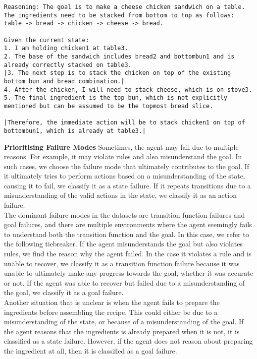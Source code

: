 \begin{lstlisting}
Reasoning: The goal is to make a cheese chicken sandwich on a table. The ingredients need to be stacked from bottom to top as follows: table -> bread -> chicken -> cheese -> bread.

Given the current state:
1. I am holding chicken1 at table3.
2. The base of the sandwich includes bread2 and bottombun1 and is already correctly stacked on table3.
|3. The next step is to stack the chicken on top of the existing bottom bun and bread combination.|
4. After the chicken, I will need to stack cheese, which is on stove3.
5. The final ingredient is the top bun, which is not explicitly mentioned but can be assumed to be the topmost bread slice.

|Therefore, the immediate action will be to stack chicken1 on top of bottombun1, which is already at table3.|
\end{lstlisting}

\textbf{Prioritising Failure Modes} Sometimes, the agent may fail due to multiple reasons. For example, it may violate rules and also misunderstand the goal. In such cases, we choose the failure mode that ultimately contributes to the goal. If it ultimately tries to perform actions based on a misunderstanding of the state, causing it to fail, we classify it as a state failure. If it repeats transitions due to a misunderstanding of the valid actions in the state, we classify it as an action failure. \\

 The dominant failure modes in the datasets are transition function failures and goal failures, and there are multiple environments where the agent seemingly fails to understand both the transition function and the goal. In this case, we refer to the following tiebreaker. If the agent misunderstands the goal but also violates rules, we find the reason why the agent failed. In the case it violates a rule and is unable to recover, we classify it as a transition function failure because it was unable to ultimately make any progress towards the goal, whether it was accurate or not. If the agent was able to recover but failed due to a misunderstanding of the goal, we classify it as a goal failure. \\

 Another situation that is unclear is when the agent fails to prepare the ingredients before assembling the recipe. This could either be due to a misunderstanding of the state, or because of a misunderstanding of the goal. If the agent reasons that the ingredients is already prepared when it is not, it is classified as a state failure. However, if the agent does not reason about preparing the ingredient at all, then it is classified as a goal failure. 
